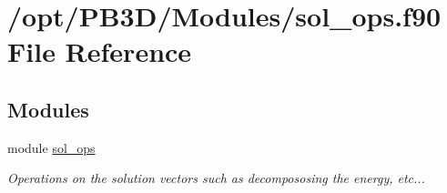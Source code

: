 \hypertarget{sol__ops_8f90}{}\section{/opt/\+P\+B3\+D/\+Modules/sol\+\_\+ops.f90 File Reference}
\label{sol__ops_8f90}
\subsection*{Modules}
\begin{DoxyCompactItemize}
\item 
module \hyperlink{namespacesol__ops}{sol\+\_\+ops}
\begin{DoxyCompactList}\small\item\em Operations on the solution vectors such as decompososing the energy, etc... \end{DoxyCompactList}\end{DoxyCompactItemize}
